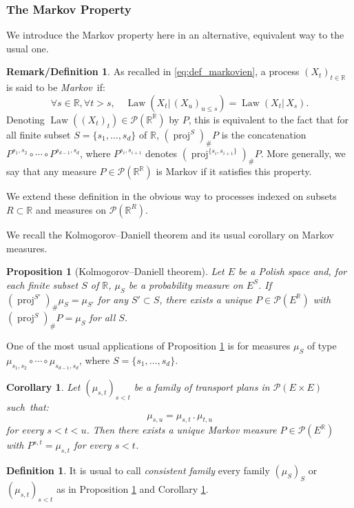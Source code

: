 \documentclass[11pt]{article}
\newcommand{\ldot}{\mathbin{.}}
\theoremstyle{plain}
\newtheorem{pro}[them]{Proposition}
\newtheorem{cor}[them]{Corollary}
\theoremstyle{definition}
\newtheorem{defi}[them]{Definition}
\newtheorem{remdefi}[them]{Remark/Definition}
\newcommand{\p}{\mathcal{P}}
\newcommand{\R}{\mathbb{R}}
\newcommand{\law}{\operatorname{Law}}
\newcommand{\pr}{\operatorname{proj}}
\begin{document}
\subsubsection{The Markov Property}

We introduce the Markov property here in an alternative, equivalent way to the usual one.

\begin{remdefi}\label{defi:markov2}As recalled in \eqref{eq:def_markovien}, a process $(X_t)_{t\in\R}$ is said to be \emph{Markov}~if:\vspace*{-3pt}
\[
\forall s\in\R,\forall t>s,\quad \law(X_t|\,(X_{u})_{u\leqslant s})=\law(X_t|\,X_{s}).
\]
Denoting $\law((X_t)_t)\in\p(\R^\R)$ by $P$, this is equivalent to the fact that for all finite subset $S=\{s_1,\ldots,s_d\}$ of $\R$, $(\pr^S)_\#P$ is the concatenation $P^{s_1,s_2}\circ\cdots\circ P^{s_{d-1},s_d}$, where $P^{s_i,s_{i+1}}$ denotes $(\pr^{\{s_i,s_{i+1}\}})_\#P$. More generally, we say that any measure $P\in\p(\R^\R)$ is Markov if it satisfies this property.

We extend these definition in the obvious way to processes indexed on subsets $R\subset \R$ and measures on $\p(\R^R)$.
\end{remdefi}

We recall the Kolmogorov--Daniell theorem and its usual corollary on Markov measures.

\begin{pro}[Kolmogorov--Daniell theorem]\label{pro:inductive_limit}
Let $E$ be a Polish space and, for each finite subset $S$ of\/ $\R$, $\mu_S$ be a probability measure on $E^S$. If $(\pr^{S'})_\#\mu_S=\mu_{S'}$ for any $S'\subset S$, there exists a unique $P\in \p(E^\R)$ with $(\pr^S)_\#P=\mu_S$ for all $S$.
\end{pro}

One of the most usual applications of Proposition \ref{pro:inductive_limit} is for measures $\mu_S$ of type $\mu_{s_1,s_2}\circ\cdots\circ \mu_{s_{d-1},s_d}$, where $S=\{s_1,\ldots,s_d\}$.

\begin{cor}\label{cor:consist}
Let $(\mu_{s,t})_{s<t}$ be a family of transport plans in $\p(E\times E)$ such~that:\vspace*{-3pt}
\[\mu_{s,u}=\mu_{s,t}{}\ldot\mu_{t,u}\]
for every $s<t<u$. Then there exists a unique Markov measure $P\in \p(E^\R)$ with $P^{s,t}=\mu_{s,t}$ for every $s<t$.
\end{cor}

\begin{defi}\label{defi:consist}It is usual to call \emph{consistent family} every family $(\mu_S)_S$ or $(\mu_{s,t})_{s<t}$ as in Proposition \ref{pro:inductive_limit} and Corollary \ref{cor:consist}.
\end{defi}
\end{document}
